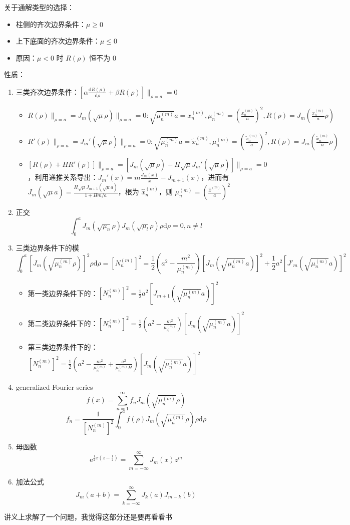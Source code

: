 \documentclass{article}
\begin{document}
关于通解类型的选择：
\begin{itemize}
    \item 柱侧的齐次边界条件：$\mu\geq 0$
    \item 上下底面的齐次边界条件：$\mu\leq 0$
    \item 原因：$\mu<0$ 时 $R(\rho)$ 恒不为 0
\end{itemize}
性质：
\begin{enumerate}
    \item 三类齐次边界条件：$[\alpha\frac{\mathrm{d}R(\rho)}{\mathrm{d}\rho}+\beta R(\rho)]\|_{\rho=a}=0$ \begin{itemize}
              \item $R(\rho)\|_{\rho=a}=J_m(\sqrt{\mu}\rho)\|_{\rho=a}=0: \sqrt{\mu^{(m)}_n}a=x^{(m)}_n,\mu^{(m)}_n=(\frac{x^{(m)}_n}{a})^2, R(\rho)=J_m(\frac{x^{(m)}_n}{a}\rho)$
              \item $R'(\rho)\|_{\rho=a}=J_m'(\sqrt{\mu}\rho)\|_{\rho=a}=0: \sqrt{\mu^{(m)}_n}a=\tilde x^{(m)}_n,\mu^{(m)}_n=(\frac{\tilde x^{(m)}_n}{a})^2, R(\rho)=J_m(\frac{\tilde x^{(m)}_n}{a}\rho)$
              \item $[R(\rho)+HR'(\rho)]\|_{\rho=a}=[J_m(\sqrt{\mu}\rho)+H\sqrt{\mu}J_m'(\sqrt{\mu}\rho)]\|_{\rho=a}=0$，利用递推关系导出：$J_m'(x)=m\frac{J_m(x)}{x}-J_{m+1}(x)$，进而有 $J_m(\sqrt\mu a)=\frac{H\sqrt\mu J_{m+1}(\sqrt\mu a)}{1+Hm/a}$，根为 $\hat x^{(m)}_n$，则 $\mu^{(m)}_n=(\frac{\hat x^{(m)}}{a})^2$
          \end{itemize}
    \item 正交 $$\int^a_0J_m(\sqrt{\mu_n}\rho)J_m(\sqrt{\mu_l}\rho)\rho\mathrm{d}\rho=0, n\neq l$$
    \item 三类边界条件下的模 $$\int^a_0[J_m(\sqrt{\mu^{(m)}_n}\rho)]^2\rho\mathrm{d}\rho=[N^{(m)}_n]^2=\frac{1}{2}(a^2-\frac{m^2}{\mu^{(m)}_n})[J_m(\sqrt{\mu^{(m)}_n}a)]^2+\frac{1}{2}a^2[J'_m(\sqrt{\mu^{(m)}_n}a)]^2$$ \begin{itemize}
              \item 第一类边界条件下的：$[N^{(m)}_n]^2=\frac{1}{2}a^2[J_{m+1}(\sqrt{\mu^{(m)}_n}a)]^2$
              \item 第二类边界条件下的：$[N^{(m)}_n]^2=\frac 1 2(a^2-\frac{m^2}{\mu^{(m)}_n})[J_m(\sqrt{\mu^{(m)}_n}a)]^2$
              \item 第三类边界条件下的：$[N^{(m)}_n]^2=\frac 1 2(a^2-\frac{m^2}{\mu^{(m)}_n}+\frac{a^2}{\mu^{(m)}_nH})[J_m(\sqrt{\mu^{(m)}_n}a)]^2$
          \end{itemize}
    \item generalized Fourier series $$f(x)=\sum^\infty_{n=1}f_nJ_m(\sqrt{\mu^{(m)}_n}\rho)$$ $$f_n=\frac{1}{[N^{(m)}_n]^2}\int^a_0f(\rho)J_m(\sqrt{\mu^{(m)}_n}\rho)\rho\mathrm{d}\rho$$
    \item 母函数 $$\mathrm{e}^{\frac{1}{2}x(z-\frac{1}{z})}=\sum^\infty_{m=-\infty}J_m(x)z^m$$
    \item 加法公式 $$J_m(a+b)=\sum^\infty_{k=-\infty}J_k(a)J_{m-k}(b)$$
\end{enumerate}
讲义上求解了一个问题，我觉得这部分还是要再看看书
\end{document}
